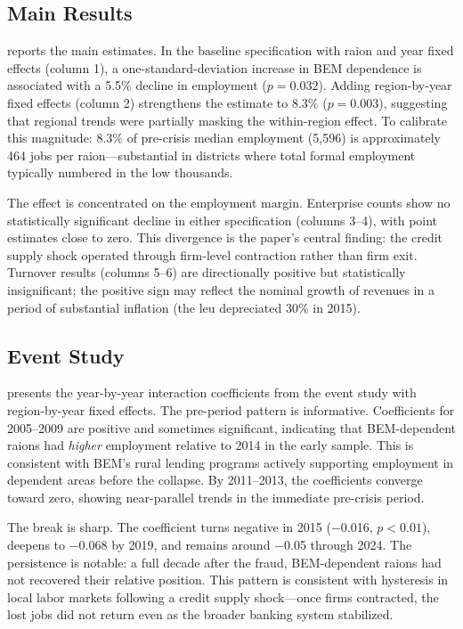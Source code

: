 \documentclass[12pt]{article}
\begin{document}
\subsection{Main Results}



 reports the main estimates. In the baseline specification with raion and year fixed effects (column 1), a one-standard-deviation increase in BEM dependence is associated with a 5.5\% decline in employment ($p = 0.032$). Adding region-by-year fixed effects (column 2) strengthens the estimate to 8.3\% ($p = 0.003$), suggesting that regional trends were partially masking the within-region effect. To calibrate this magnitude: 8.3\% of pre-crisis median employment (5,596) is approximately 464 jobs per raion---substantial in districts where total formal employment typically numbered in the low thousands.

The effect is concentrated on the employment margin. Enterprise counts show no statistically significant decline in either specification (columns 3--4), with point estimates close to zero. This divergence is the paper's central finding: the credit supply shock operated through firm-level contraction rather than firm exit. Turnover results (columns 5--6) are directionally positive but statistically insignificant; the positive sign may reflect the nominal growth of revenues in a period of substantial inflation (the leu depreciated 30\% in 2015).

\subsection{Event Study}



 presents the year-by-year interaction coefficients from the event study with region-by-year fixed effects. The pre-period pattern is informative. Coefficients for 2005--2009 are positive and sometimes significant, indicating that BEM-dependent raions had \emph{higher} employment relative to 2014 in the early sample. This is consistent with BEM's rural lending programs actively supporting employment in dependent areas before the collapse. By 2011--2013, the coefficients converge toward zero, showing near-parallel trends in the immediate pre-crisis period.

The break is sharp. The coefficient turns negative in 2015 ($-$0.016, $p < 0.01$), deepens to $-$0.068 by 2019, and remains around $-$0.05 through 2024. The persistence is notable: a full decade after the fraud, BEM-dependent raions had not recovered their relative position. This pattern is consistent with hysteresis in local labor markets following a credit supply shock---once firms contracted, the lost jobs did not return even as the broader banking system stabilized.
\end{document}
